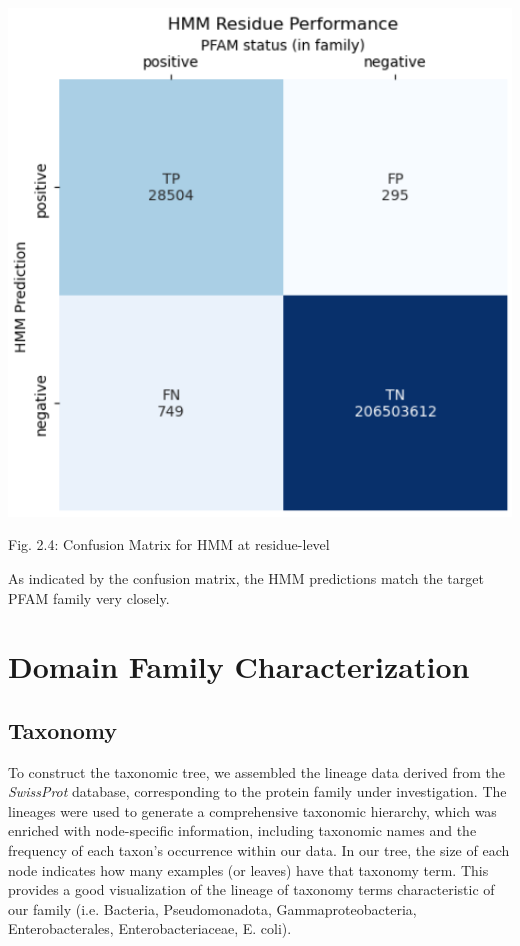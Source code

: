 \documentclass[10pt,twocolumn,letterpaper]{article}
\begin{document}
\begin{center}
    \includegraphics[scale=0.45]{report/img/hmm_res_performance.png}
\end{center}

\begin{center}
    \small{Fig. 2.4: Confusion Matrix for HMM at residue-level}
\end{center}

As indicated by the confusion matrix, the HMM predictions match the target PFAM family very closely.

\section{Domain Family Characterization}

\subsection{Taxonomy}

To construct the taxonomic tree, we assembled the lineage data derived from the \textit{SwissProt} database, corresponding to the protein family under investigation. The lineages were used to generate a comprehensive taxonomic hierarchy, which was enriched with node-specific information, including taxonomic names and the frequency of each taxon's occurrence within our data. In our tree, the size of each node indicates how many examples (or leaves) have that taxonomy term. This provides a good visualization of the lineage of taxonomy terms characteristic of our family (i.e. Bacteria, Pseudomonadota, Gammaproteobacteria, Enterobacterales, Enterobacteriaceae, E. coli). \\
\end{document}
